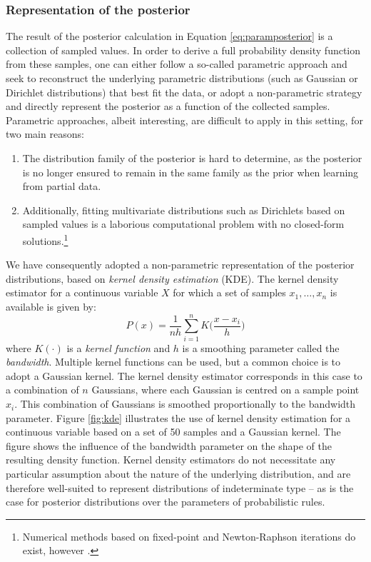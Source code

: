 \subsubsection*{Representation of the posterior}

The result of the posterior calculation in Equation \eqref{eq:paramposterior} is a collection of sampled values. In order to derive a full probability density function from these samples, one can either follow a so-called parametric approach and seek to reconstruct the underlying parametric distributions (such as Gaussian or Dirichlet distributions) that best fit the data, or adopt a non-parametric strategy and directly represent the posterior as a function of the collected samples. Parametric approaches, albeit interesting, are difficult to apply in this setting, for two main reasons:
\begin{enumerate}
\item The distribution family of the posterior is hard to determine, as the posterior is no longer ensured to remain in the same family as the prior when learning from partial data.  
\item Additionally, fitting multivariate distributions such as Dirichlets based on sampled values is a laborious computational problem with no closed-form solutions.\footnote{Numerical methods based on fixed-point and Newton-Raphson iterations do exist, however \citep{minka2003}.}
\end{enumerate}

We have consequently adopted a non-parametric representation of the posterior distributions, based on \textit{kernel density estimation} (KDE).  The kernel density estimator for a continuous variable $X$ for which a set of samples $x_1, \dots, x_n$ is available is given by:
\begin{equation}
P(x) = \frac{1}{nh} \sum_{i=1}^n K\Big(\frac{x-x_i}{h}\Big) \label{eq:kde}
\end{equation}
where $K(\cdot)$ is a \textit{kernel function} and $h$ is a smoothing parameter called the \textit{bandwidth}. Multiple kernel functions can be used, but a common choice is to adopt a Gaussian kernel. The kernel density estimator corresponds in this case to a combination of $n$ Gaussians, where each Gaussian is centred on a sample point $x_i$.  This combination of Gaussians is smoothed proportionally to the bandwidth parameter. Figure \ref{fig:kde} illustrates the use of kernel density estimation for a continuous variable based on a set of 50 samples and a Gaussian kernel. The figure shows the influence of the bandwidth parameter on the shape of the resulting density function. Kernel density estimators do not necessitate any particular assumption about the nature of the underlying distribution, and are therefore well-suited to represent distributions of indeterminate type -- as is the case for posterior distributions over the parameters of probabilistic rules. 

